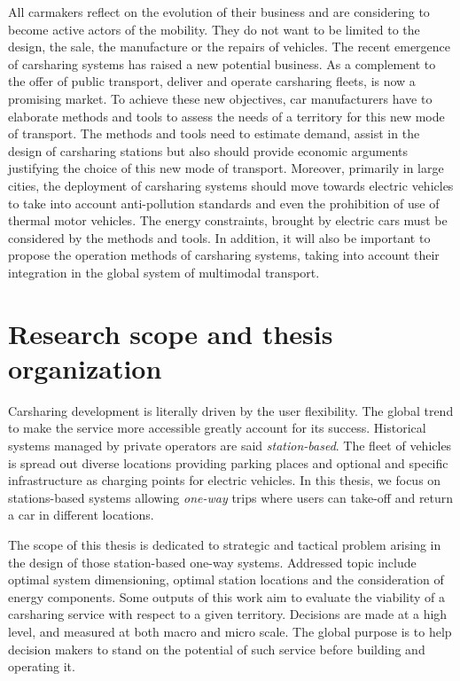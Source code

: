 \begin{bibunit}[ieeetr]
All carmakers reflect on the evolution of their business and are considering to become active actors of the mobility. 
They do not want to be limited to the design, the sale, the manufacture or the repairs of vehicles.
The recent emergence of carsharing systems has raised a new potential business.
As a complement to the offer of public transport, deliver and operate carsharing fleets, is now a promising market.
To achieve these new objectives, car manufacturers have to elaborate methods and tools to assess the needs of a territory for this new mode of transport.
The methods and tools need to estimate demand, assist in the design of carsharing stations but also should provide economic arguments justifying the choice of this new mode of transport.
Moreover, primarily in large cities, the deployment of carsharing systems should move towards electric vehicles to take into account anti-pollution standards and even the prohibition of use of thermal motor vehicles.
The energy constraints, brought by electric cars must be considered by the methods and tools.
In addition, it will also be important to propose the operation methods of carsharing systems, taking into account their integration in the global system of multimodal transport.


\section{Research scope and thesis organization}
Carsharing development is literally driven by the user flexibility.
The global trend to make the service more accessible greatly account for its success.
Historical systems managed by private operators are said \emph{station-based}.
The fleet of vehicles is spread out diverse locations providing parking places and optional and specific infrastructure as charging points for electric vehicles.
In this thesis, we focus on stations-based systems allowing \emph{one-way} trips where users can take-off and return a car in different locations.

\medskip
The scope of this thesis is dedicated to strategic and tactical problem arising in the design of those station-based one-way systems.
Addressed topic include optimal system dimensioning, optimal station locations and the consideration of energy components.
Some outputs of this work aim to evaluate the viability of a carsharing service with respect to a given territory.
Decisions are made at a high level, and measured at both macro and micro scale.
The global purpose is to help decision makers to stand on the potential of such service before building and operating it.


\end{bibunit}
